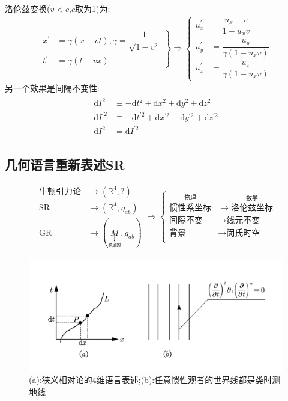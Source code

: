洛伦兹变换($v<c$,$c$取为1)为:
\begin{align}
    \left.
\begin{aligned}
    x^\prime&=\gamma(x-vt),\gamma=\dfrac{1}{\sqrt{1-v^2}}\\
    t^\prime&=\gamma(t-vx)
\end{aligned}
\right\}\Rightarrow
\left\{
\begin{aligned}
    u_x^\prime&=\dfrac{u_x-v}{1-u_xv}\\
    u_y^\prime&=\dfrac{u_y}{\gamma(1-u_xv)}\\
    u_z^\prime&=\dfrac{u_z}{\gamma(1-u_xv)}
\end{aligned}
\right.
\end{align}
另一个效果是间隔不变性:
\begin{align}
    \begin{aligned}
        \text{d}I^2&\equiv-\text{d}t^2+\text{d}x^2+\text{d}y^2+\text{d}z^2\\
        \text{d}I^{\prime2}&\equiv-\text{d}t^{\prime2}+\text{d}x^{\prime2}+\text{d}y^{\prime2}+\text{d}z^{\prime2}\\
        \text{d}I^2&=\text{d}I^{\prime2}
    \end{aligned}
\end{align}

\subsection{几何语言重新表述SR}
$$
\begin{aligned}
    \text{牛顿引力论}&\to (\mathbb{R}^4,?)\\
    \text{SR}&\to (\mathbb{R}^4,\eta_{ab})\\
    \text{GR}&\to (\underset{\underset{\text{联通的}}{\downarrow}}{M},g_{ab})
\end{aligned}
\Longrightarrow
\left\{
\begin{aligned}
\overset{\underset{}{\text{物理}}}{\text{惯性系坐标}}&\to \overset{\underset{}{\text{数学}}}{\text{洛伦兹坐标}}\\
\text{间隔不变}&\to \text{线元不变}\\
\text{背景}&\to \text{闵氏时空}\\
\end{aligned}
\right.
$$

\begin{figure}[htbp]
    \centering
 \includegraphics[width=\textwidth]{Pictures/6-4.png}
    \caption{(a):狭义相对论的4维语言表述;(b):任意惯性观者的世界线都是类时测地线}
    \label{fig:6-4}
\end{figure}


